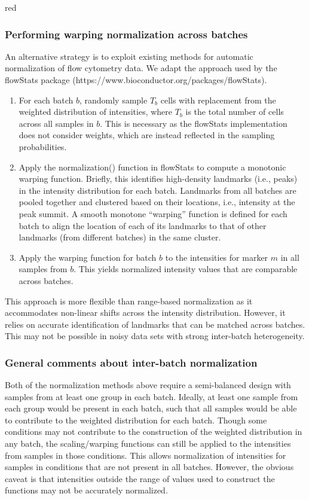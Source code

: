 \documentclass{article}
\begin{document}
\begin{color}{red}
\subsubsection{Performing warping normalization across batches}
An alternative strategy is to exploit existing methods for automatic normalization of flow cytometry data.
We adapt the approach used by the flowStats package (https://www.bioconductor.org/packages/flowStats).
\begin{enumerate}
    \item For each batch $b$, randomly sample $T_b$ cells with replacement from the weighted distribution of intensities,
        where $T_b$ is the total number of cells across all samples in $b$.
        This is necessary as the flowStats implementation does not consider weights, which are instead reflected in the sampling probabilities.
    \item Apply the normalization() function in flowStats to compute a monotonic warping function.
        Briefly, this identifies high-density landmarks (i.e., peaks) in the intensity distribution for each batch.
        Landmarks from all batches are pooled together and clustered based on their locations, i.e., intensity at the peak summit.
        A smooth monotone ``warping'' function \cite{ramsay2002applied} is defined for each batch to align the location of each of its landmarks to that of other landmarks (from different batches) in the same cluster.
    \item Apply the warping function for batch $b$ to the intensities for marker $m$ in all samples from $b$.
        This yields normalized intensity values that are comparable across batches.
\end{enumerate}
This approach is more flexible than range-based normalization as it accommodates non-linear shifts across the intensity distribution.
However, it relies on accurate identification of landmarks that can be matched across batches.
This may not be possible in noisy data sets with strong inter-batch heterogeneity.

\subsubsection{General comments about inter-batch normalization}
Both of the normalization methods above require a semi-balanced design with samples from at least one group in each batch.
Ideally, at least one sample from each group would be present in each batch, such that all samples would be able to contribute to the weighted distribution for each batch.
Though some conditions may not contribute to the construction of the weighted distribution in any batch, the scaling/warping functions can still be applied to the intensities from samples in those conditions.
This allows normalization of intensities for samples in conditions that are not present in all batches.
However, the obvious caveat is that intensities outside the range of values used to construct the functions may not be accurately normalized.


\end{color}
\end{document}
